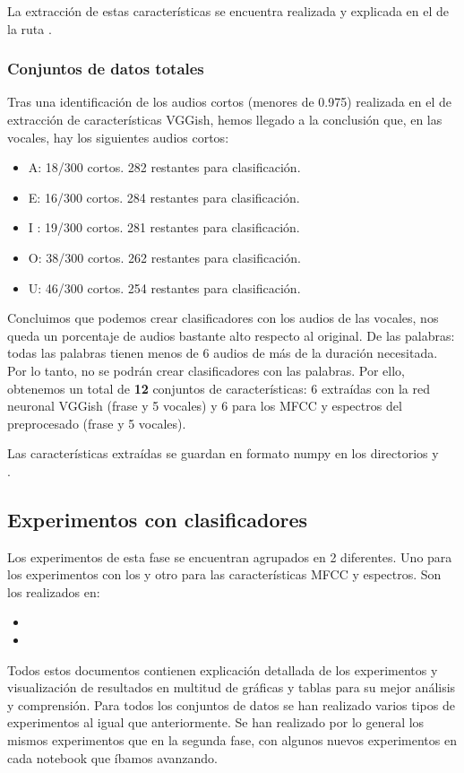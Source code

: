 La extracción de estas características se encuentra realizada y explicada en el  de la ruta .


\subsubsection{Conjuntos de datos totales}
Tras una identificación de los audios cortos (menores de 0.975) realizada en el  de extracción de características VGGish, hemos llegado a la conclusión que, en las vocales, hay los siguientes audios cortos:
\begin{itemize}
\item A: 18/300 cortos. 282 restantes para clasificación.
\item E: 16/300 cortos. 284 restantes para clasificación.
\item I : 19/300 cortos. 281 restantes para clasificación.
\item O: 38/300 cortos. 262 restantes para clasificación.
\item U: 46/300 cortos. 254 restantes para clasificación. 
\end{itemize}

Concluimos que podemos crear clasificadores con los audios de las vocales, nos queda un porcentaje de audios bastante alto respecto al original. De las palabras: todas las palabras tienen menos de 6 audios de más de la duración necesitada. Por lo tanto, no se podrán crear clasificadores con las palabras. Por ello, obtenemos un total de \textbf{12} conjuntos de características: 6 extraídas con la red neuronal VGGish (frase y 5 vocales) y 6 para los MFCC y espectros del preprocesado (frase y 5 vocales).

Las características extraídas se guardan en formato numpy en los directorios  y \\ .


\subsection{Experimentos con clasificadores}
Los experimentos de esta fase se encuentran agrupados en 2  diferentes. Uno para los experimentos con los  y otro para las características MFCC y espectros. Son los realizados en:
\begin{itemize}
\item {}
\item {}
\end{itemize} 
Todos estos documentos contienen explicación detallada de los experimentos y visualización de resultados en multitud de gráficas y tablas para su mejor análisis y comprensión. Para todos los conjuntos de datos se han realizado varios tipos de experimentos al igual que anteriormente. Se han realizado por lo general los mismos experimentos que en la segunda fase, con algunos nuevos experimentos en cada notebook que íbamos avanzando.

